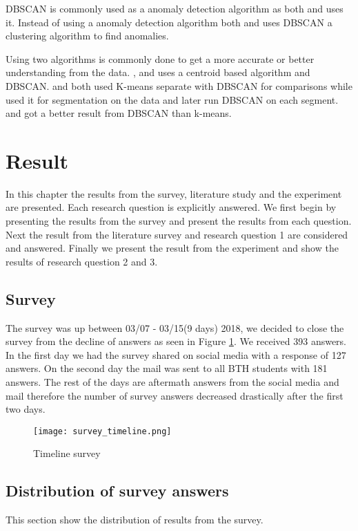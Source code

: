 \documentclass[a4paper]{article}
\begin{document}
DBSCAN is commonly used as a anomaly detection algorithm as both \cite{temperatur} and \cite{airplane} uses it. Instead of using a anomaly detection algorithm both \cite{temperatur} and \cite{airplane} uses DBSCAN a clustering algorithm to find anomalies.

Using two algorithms is commonly done to get a more accurate or better understanding from the data. \cite{k-meansDBSCANhybird},\cite{erman2006traffic} and \cite{Kinable2011MalwareCB} uses a centroid based algorithm and DBSCAN. \cite{Kinable2011MalwareCB} and \cite{erman2006traffic} both used K-means separate with DBSCAN for comparisons while \cite{k-meansDBSCANhybird} used it for segmentation on the data and later run DBSCAN on each segment. \cite{Kinable2011MalwareCB} and \cite{erman2006traffic} got a better result from DBSCAN than k-means.


\newpage
\section{Result}
In this chapter the results from the survey, literature study and the experiment are presented. Each research question is explicitly answered. We first begin by presenting the results from the survey and present the results from each question. Next the result from the literature survey and research question 1 are considered and answered. Finally we present the result from the experiment and show the results of research question 2 and 3.

\subsection{Survey}
The survey was up between 03/07 - 03/15(9 days) 2018, we decided to close the survey from the decline of answers as seen in Figure \ref{fig:survey}. We received 393 answers. In the first day we had the survey shared on social media with a response of 127 answers. On the second day the mail was sent to all BTH students with 181 answers. The rest of the days are aftermath answers from the social media and mail therefore the number of survey answers decreased drastically after the first two days. 
\begin{figure}[h]
  \centering
    \texttt{[image: survey\_timeline.png]}
  \caption{Timeline survey}
  \label{fig:survey}
\end{figure}

\newpage
\subsection{Distribution of survey answers}
This section show the distribution of results from the survey.\newline\\
\end{document}
